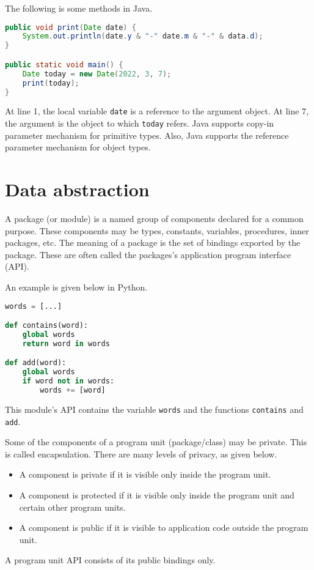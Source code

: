 \documentclass[a4paper, openany]{memoir}
\begin{document}
The following is some methods in Java.
\begin{lstlisting}[language=Java]
public void print(Date date) {
    System.out.println(date.y & "-" date.m & "-" & data.d);
}

public static void main() {
    Date today = new Date(2022, 3, 7);
    print(today);
}
\end{lstlisting}
At line 1, the local variable \texttt{date} is a reference to the argument object. At line 7, the argument is the object to which \texttt{today} refers. Java supports copy-in parameter mechanism for primitive types. Also, Java supports the reference parameter mechanism for object types.
\newpage

\section{Data abstraction}
A package (or module) is a named group of components declared for a common purpose. These components may be types, constants, variables, procedures, inner packages, etc. The meaning of a package is the set of bindings exported by the package. These are often called the packages's application program interface (API).

An example is given below in Python.
\begin{lstlisting}[language=python]
words = [...]

def contains(word):
    global words
    return word in words

def add(word):
    global words
    if word not in words:
        words += [word]
\end{lstlisting}
This module's API contains the variable \texttt{words} and the functions \texttt{contains} and \texttt{add}.

Some of the components of a program unit (package/class) may be private. This is called encapsulation. There are many levels of privacy, as given below.
\begin{itemize}
    \item A component is private if it is visible only inside the program unit.
    \item A component is protected if it is visible only inside the program unit and certain other program units.
    \item A component is public if it is visible to application code outside the program unit.
\end{itemize}
A program unit API consists of its public bindings only.
\end{document}
